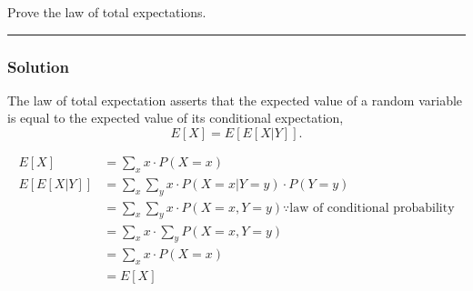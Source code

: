 \newpage
\begin{question}
Prove the law of total expectations.
\end{question}

\par\noindent\rule{\textwidth}{0.5pt}

\subsubsection*{Solution}

The law of total expectation asserts that the expected value of a random variable is equal to the expected value of its conditional expectation, $$E[X] = E[E[X|Y]].$$

\begin{align*}
    E[X] &= \sum_{x} x \cdot P(X = x) \\
    E[E[X|Y]] &= \sum_{x} \sum_{y} x \cdot P(X = x | Y = y) \cdot P(Y = y)\\
    &= \sum_x \sum_y x \cdot P(X = x, Y = y) \because \text{law of conditional probability}\\
    &= \sum_x x \cdot \sum_y P(X = x, Y = y) \\
    &= \sum_x x \cdot P(X = x) \\
    &= E[X]
\end{align*}
